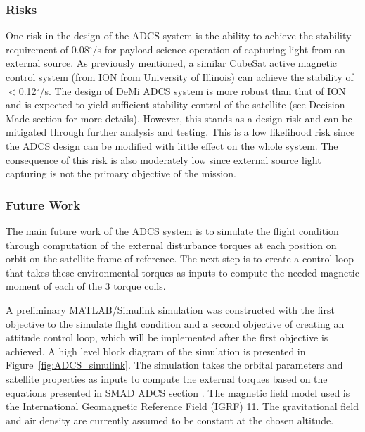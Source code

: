 \documentclass[12pt]{article}
\begin{document}
			\subsubsection{Risks}
			One risk in the design of the ADCS system is the ability to achieve the stability requirement of 0.08$^\circ$/s for payload science operation of capturing light from an external source. As previously mentioned, a similar CubeSat active magnetic control system (from ION from University of Illinois) can achieve the stability of $<$0.12$^\circ$/s. The design of DeMi ADCS system is more robust than that of ION and is expected to yield sufficient stability control of the satellite (see Decision Made section for more details). However, this stands as a design risk and can be mitigated through further analysis and testing. This is a low likelihood risk since the ADCS design can be modified with little effect on the whole system. The consequence of this risk is also moderately low since external source light capturing is not the primary objective of the mission. 
			\subsubsection{Future Work}
			The main future work of the ADCS system is to simulate the flight condition through computation of the external disturbance torques at each position on orbit on the satellite frame of reference. The next step is to create a control loop that takes these environmental torques as inputs to compute the needed magnetic moment of each of the 3 torque coils. 
			
			A preliminary MATLAB/Simulink simulation was constructed with the first objective to the simulate flight condition and a second objective of creating an attitude control loop, which will be implemented after the first objective is achieved. A high level block diagram of the simulation is presented in Figure~\ref{fig:ADCS_simulink}. The simulation takes the orbital parameters and satellite properties as inputs to compute the external torques based on the equations presented in SMAD ADCS section \cite{adcs_smad2}. The magnetic field model used is the International Geomagnetic Reference Field (IGRF) 11. The gravitational field and air density are currently assumed to be constant at the chosen altitude. 
			
\end{document}
